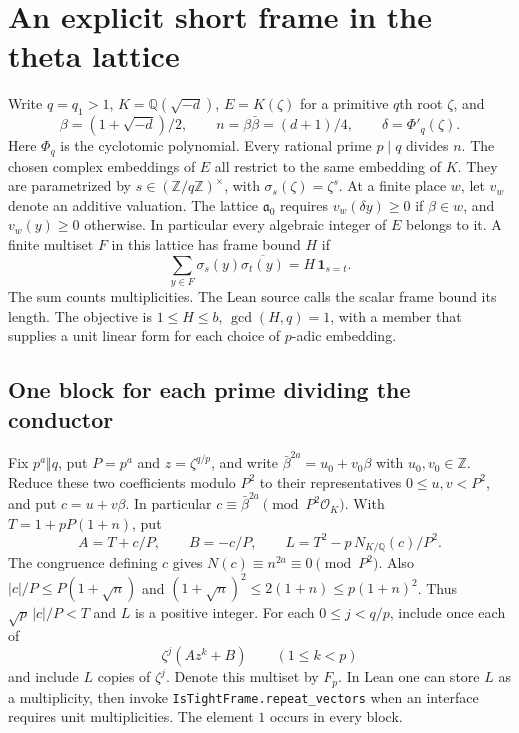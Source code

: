 \documentclass[11pt,letterpaper]{article}
\begin{document}
\section{An explicit short frame in the theta lattice}

Write $q=q_1>1$, $K=\mathbb Q(\sqrt{-d})$, $E=K(\zeta)$ for a
primitive $q$th root $\zeta$, and
\[
  \beta=(1+\sqrt{-d})/2,\qquad n=\beta\bar\beta=(d+1)/4,
  \qquad \delta=\Phi'_q(\zeta).
\]
Here $\Phi_q$ is the cyclotomic polynomial. Every rational prime $p\mid q$
divides $n$. The chosen complex embeddings of $E$ all restrict to the
same embedding of $K$. They are parametrized by
$s\in(\mathbb Z/q\mathbb Z)^\times$, with $\sigma_s(\zeta)=\zeta^s$.
At a finite place $w$, let $v_w$ denote an additive valuation.
The lattice $\mathfrak a_0$ requires $v_w(\delta y)\geq0$ if
$\beta\in w$, and $v_w(y)\geq0$ otherwise. In particular every
algebraic integer of $E$ belongs to it. A finite multiset $F$ in this
lattice has frame bound $H$ if
\[
  \sum_{y\in F}\sigma_s(y)\overline{\sigma_t(y)}
  =H\,\mathbf1_{s=t}.
\]
The sum counts multiplicities. The Lean source calls the scalar frame bound its length. The objective is $1\leq H\leq b$,
$\gcd(H,q)=1$, with a member that supplies a unit linear form for each
choice of $p$-adic embedding.

\subsection{One block for each prime dividing the conductor}
Fix $p^a\Vert q$, put $P=p^a$ and $z=\zeta^{q/p}$,
and write $\bar\beta^{2a}=u_0+v_0\beta$ with $u_0,v_0\in\mathbb Z$.
Reduce these two coefficients modulo $P^2$ to their representatives
$0\le u,v<P^2$, and put $c=u+v\beta$. In particular
$c\equiv\bar\beta^{2a}\pmod{P^2\mathcal O_K}$. With
$T=1+pP(1+n)$, put
\[
     A=T+c/P,\qquad B=-c/P,\qquad
     L=T^2-p\,N_{K/\mathbb Q}(c)/P^2.
\]
The congruence defining $c$ gives $N(c)\equiv n^{2a}\equiv0\pmod{P^2}$.
Also $|c|/P\le P(1+\sqrt n)$ and
$(1+\sqrt n)^2\le2(1+n)\le p(1+n)^2$. Thus
$\sqrt p\,|c|/P<T$ and $L$ is a positive integer. For each $0\leq j<q/p$, include once each of
\[
        \zeta^j(Az^k+B)\qquad(1\leq k<p)
\]
and include $L$ copies of $\zeta^j$. Denote this multiset by $F_p$.
In Lean one can store $L$ as a multiplicity, then invoke
\texttt{IsTightFrame.repeat\_vectors} when an interface requires
unit multiplicities. The element $1$ occurs in every block.
\end{document}
